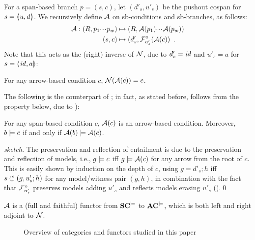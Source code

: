 For a span-based branch $p=(s,c)$, let $(d'_s,u'_s)$ be the pushout cospan for $s=\spanof u d$. We recursively define $\mathcal{A}$ on sb-conditions and sb-branches, as follows:
%
\begin{align*}
\mathcal{A}: (R,p_1{\cdotp\mkern-2mu\cdotp\mkern-2mu\cdotp\mkern1mu} p_w) & \mapsto (R,\mathcal{A}(p_1){\cdotp\mkern-2mu\cdotp\mkern-2mu\cdotp\mkern1mu} \mathcal{A}(p_w)) \\
     (s,c) & \mapsto (d'_s,\mathcal{F}^\circ_{u'_s}(\mathcal{A}(c)) \enspace.
\end{align*}
%
Note that this acts as the (right) inverse of $\mathcal{N}$, due to $d'_s=\mathit{id}$ and $u'_s=a$ for $s=\spanof{\id}{a}$:
%
\begin{lemma}
For any arrow-based condition $c$, $\mathcal{N}(\mathcal{A}(c))=c$.
\end{lemma}
%
The following is the counterpart of ; in fact, as stated before,  follows from the property below, due to ):
%
\begin{proposition}
For any span-based condition $c$, $\mathcal{A}(c)$ is an arrow-based condition. Moreover, $b\models c$ if and only if $\mathcal{A}(b)\models \mathcal{A}(c)$.
\end{proposition}
%
\begin{proof}[sketch]
The preservation and reflection of entailment is due to the preservation and reflection of models, i.e., $g\models c$ iff $g\models\mathcal{A}(c)$ for any arrow from the root of $c$. This is easily shown by induction on the depth of $c$, using $g=d'_s;h$ iff $s\circlearrowleft (g,u'_s;h)$ for any model/witness pair $(g,h)$, in combination with the fact that $\mathcal{F}^\circ_{u'_s}$ preserves models adding $u'_s$ and reflects models erasing $u'_s$ ().\qed
\end{proof}
%
\begin{theorem}
$\mathcal{A}$ is a (full and faithful) functor from $\mathbf{SC}^{\models}$ to $\mathbf{AC}^{\models}$, which is both left and right adjoint to $\mathcal{N}$.
\end{theorem}


\begin{figure}[t]
\centering

\caption{Overview of categories and functors studied in this paper}
\end{figure}

